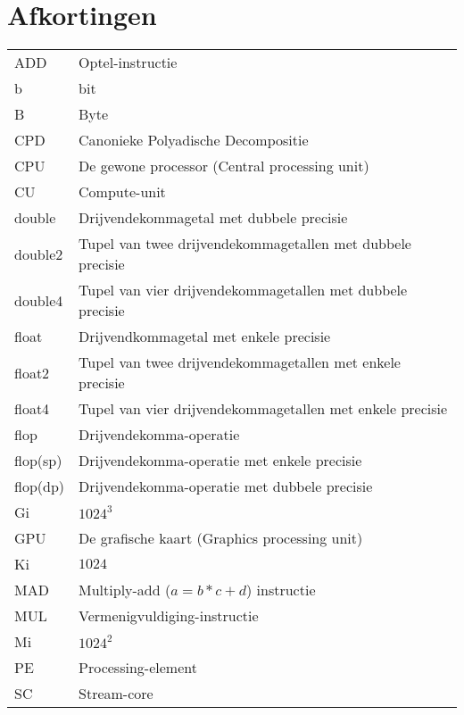 \documentclass[master=cws ,masteroption=gs]{kulemt}
\begin{document}
\section*{Afkortingen}
\begin{flushleft}
	\renewcommand{\arraystretch}{1.1}
  	\begin{tabularx}{\textwidth}{@{}p{12mm}X@{}}
	ADD			& Optel-instructie\\
	b			& bit\\
	B			& Byte\\
    	CPD			& Canonieke Polyadische Decompositie\\
    	CPU			& De gewone processor (Central processing unit)\\
    	CU			& Compute-unit\\
    	double			& Drijvendekommagetal met dubbele precisie\\
    	double2			& Tupel van twee drijvendekommagetallen met dubbele precisie\\
    	double4			& Tupel van vier drijvendekommagetallen met dubbele precisie\\
    	float			& Drijvendkommagetal met enkele precisie\\
    	float2			& Tupel van twee drijvendekommagetallen met enkele precisie\\
    	float4			& Tupel van vier drijvendekommagetallen met enkele precisie\\
    	flop			& Drijvendekomma-operatie\\
    	flop(sp)		& Drijvendekomma-operatie met enkele precisie\\
    	flop(dp)		& Drijvendekomma-operatie met dubbele precisie\\
    	Gi			& $1024^3$\\
    	GPU			& De grafische kaart (Graphics processing unit)\\
    	Ki			& $1024$\\
    	MAD			& Multiply-add ($a = b * c + d$) instructie\\
	MUL			& Vermenigvuldiging-instructie\\
    	Mi			& $1024^2$\\
    	PE			& Processing-element\\
    	SC			& Stream-core\\
  	\end{tabularx}
\end{flushleft}
\newpage
\end{document}
